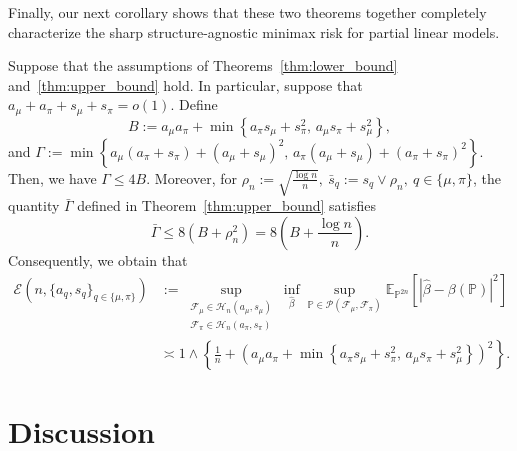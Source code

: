 \documentclass[11pt]{article}
\begin{document}
Finally, our next corollary shows that these two theorems together completely characterize the sharp structure-agnostic minimax risk for partial linear models.

\begin{corollary}
\label{cor:final_characterization}
Suppose that the assumptions of
Theorems~\ref{thm:lower_bound} and~\ref{thm:upper_bound}
hold. In particular, suppose that $a_\mu+a_\pi+s_\mu+s_\pi=o(1)$. Define
\[
B
:=
a_\mu a_\pi
+
\min\left\{
a_\pi s_\mu+s_\pi^2,\,
a_\mu s_\pi+s_\mu^2
\right\},
\]
and $\Gamma
:=
\min\left\{
a_\mu(a_\pi+s_\pi)+(a_\mu+s_\mu)^2,\,
a_\pi(a_\mu+s_\mu)+(a_\pi+s_\pi)^2
\right\}$. Then, we have $\Gamma\le 4B$.
Moreover, for $\rho_n:=\sqrt{\frac{\log n}{n}},
\ 
\bar s_q:=s_q\vee\rho_n,
\  q\in\{\mu,\pi\}$, the quantity $\bar\Gamma$ defined in
Theorem~\ref{thm:upper_bound} satisfies
\[
\bar\Gamma
\le
8\left(B+\rho_n^2\right)
=
8\left(B+\frac{\log n}{n}\right).
\]
Consequently, we obtain that
\begin{align*}
\mathcal E
\left(
n,\{a_q,s_q\}_{q\in\{\mu,\pi\}}
\right)
&:=
\sup_{\substack{
\mathcal F_\mu\in\mathcal H_n(a_\mu,s_\mu)\\
\mathcal F_\pi\in\mathcal H_n(a_\pi,s_\pi)
}}
\inf_{\widehat\beta}
\sup_{\mathbb P\in
\mathcal P(\mathcal F_\mu,\mathcal F_\pi)}
\mathbb E_{\mathbb P^{2n}}
\left[
\left|
\widehat\beta-\beta(\mathbb P)
\right|^2
\right]
\\
&\asymp
1\wedge
\left\{
\frac1n+
\left(
a_\mu a_\pi+
\min\left\{
a_\pi s_\mu+s_\pi^2,\,
a_\mu s_\pi+s_\mu^2
\right\}
\right)^2
\right\}.
\end{align*}
\end{corollary}
\fi

\section{Discussion}
\label{sec:discussion}
\end{document}
